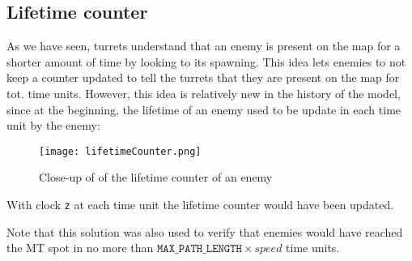 \documentclass[
10pt, %
a4paper, %
oneside, %
headinclude,footinclude, %
BCOR5mm, %
]{scrartcl}
\begin{document}
		\subsection{Lifetime counter}
			As we have seen, turrets understand that an enemy is present on the map for a shorter amount of time by looking to its spawning. This idea lets enemies to not keep a counter updated to tell the turrets that they are present on the map for tot. time units. However, this idea is relatively new in the history of the model, since at the beginning, the lifetime of an enemy used to be update in each time unit by the enemy:
			
			\begin{figure}[h!]
				\centering
				\texttt{[image: lifetimeCounter.png]}
				\caption{Close-up of of the lifetime counter of an enemy}
			\end{figure}
			With clock \texttt{z} at each time unit the lifetime counter would have been updated.
			
			Note that this solution was also used to verify that enemies would have reached the MT spot in no more than $\texttt{MAX\_PATH\_LENGTH}\times speed$ time units.
	\nocite{1,2,3,4,5,6,7}
	\printbibliography
\end{document}
